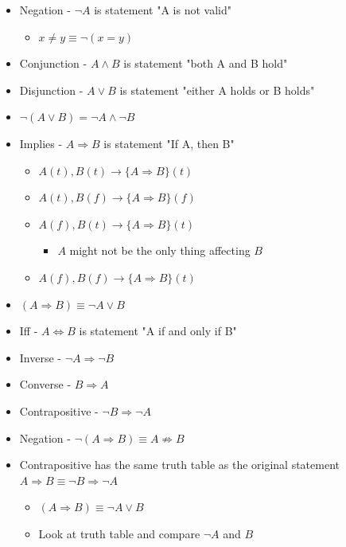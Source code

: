 \documentclass{article}
\begin{document}
\begin{itemize}
\subsection{Lecture Notes}
    \item Negation - $\neg A$ is statement "A is not valid"
    \begin{itemize}
        \item $x \neq y \equiv \neg(x=y)$
    \end{itemize} 
    \item Conjunction - $A \wedge B$ is statement "both A and B hold"
    \item Disjunction - $A \vee B$ is statement "either A holds or B holds"
    \item $\neg(A \vee B) = \neg A \wedge \neg B$
    \item Implies - $A \Rightarrow B$ is statement "If A, then B"
    \begin{itemize}
        \item $A(t),B(t) \rightarrow \{ A \Rightarrow B \} (t)$
        \item $A(t),B(f) \rightarrow \{ A \Rightarrow B \} (f)$
        \item $A(f),B(t) \rightarrow \{ A \Rightarrow B \} (t)$
        \begin{itemize}
            \item $A$ might not be the only thing affecting $B$
        \end{itemize}
        \item $A(f),B(f) \rightarrow \{ A \Rightarrow B \} (t)$
    \end{itemize}
    \item $(A \Rightarrow B) \equiv \neg A \vee B$
    \item Iff - $A \Longleftrightarrow B$ is statement "A if and only if B"
    \item Inverse - $\neg A \Rightarrow \neg B$
    \item Converse - $B \Rightarrow A$
    \item Contrapositive - $\neg B \Rightarrow \neg A$
    \item Negation - $\neg(A \Rightarrow B) \equiv A \nRightarrow B$
    \item Contrapositive has the same truth table as the original statement $A \Rightarrow B \equiv \neg B \Rightarrow \neg A$
    \begin{itemize}
        \item $(A \Rightarrow B) \equiv \neg A \vee B$
        \item Look at truth table and compare $\neg A$ and $B$

\end{itemize}
\end{itemize}
\end{document}

